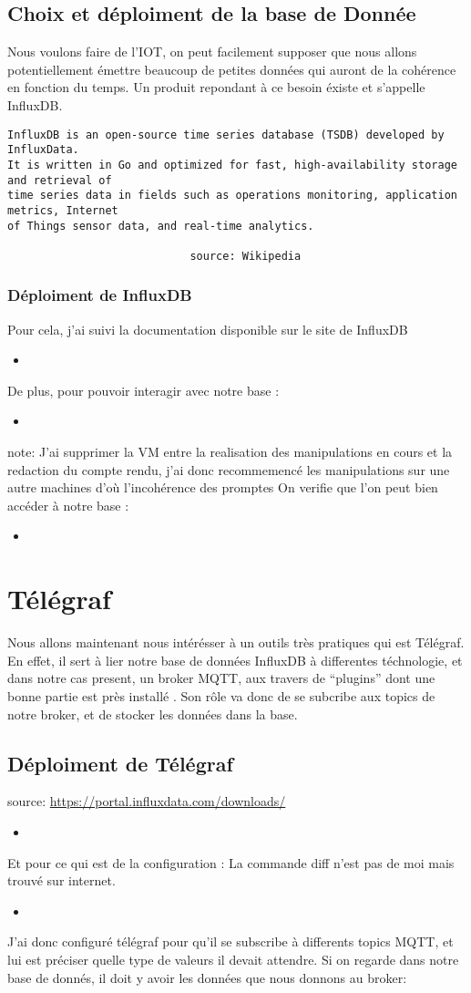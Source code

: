 \documentclass[10pt,a4paper]{article}
\newcommand{\insertcode}[2]{\begin{itemize}\item[]\end{itemize}}
\begin{document}
 \subsection{Choix et déploiment de la base de Donnée}
 Nous voulons faire de l'IOT, on peut facilement supposer que nous allons potentiellement émettre beaucoup de petites données qui auront de la cohérence en fonction du temps. Un produit repondant à ce besoin éxiste et s'appelle InfluxDB. 
\begin{lstlisting}
InfluxDB is an open-source time series database (TSDB) developed by InfluxData.
It is written in Go and optimized for fast, high-availability storage and retrieval of
time series data in fields such as operations monitoring, application metrics, Internet
of Things sensor data, and real-time analytics. 

                            source: Wikipedia 
\end{lstlisting}
\subsubsection{Déploiment de InfluxDB}
Pour cela, j'ai suivi la documentation disponible sur le site de InfluxDB
\insertcode{commande/installinflux.txt}{Installation de InfluxDB}
De plus, pour pouvoir interagir avec notre base :
\insertcode{commande/installclient.txt}{Installation du client}
note: J'ai supprimer la VM entre la realisation des manipulations en cours et la redaction du compte rendu, j'ai donc recommemencé les manipulations sur une autre machines d'où l'incohérence des promptes
On verifie que l'on peut bien accéder à notre base :
\insertcode{commande/influx.txt}{accées à la base}

\section{Télégraf}
Nous allons maintenant nous intérésser à un outils très pratiques qui est Télégraf. En effet, il sert à lier notre base de données InfluxDB à differentes téchnologie, et dans notre cas present, un broker MQTT, aux travers de ``plugins'' dont une bonne partie est près installé . Son rôle va donc de se subcribe aux topics de notre broker, et de stocker les données dans la base. 
\subsection{Déploiment de Télégraf}
source: \url{https://portal.influxdata.com/downloads/}
\insertcode{commande/telegraf.txt}{Déploiment de télégraf}
Et pour ce qui est de la configuration : La commande diff n'est pas de moi mais trouvé sur internet. 
\insertcode{commande/telegrafconf.txt}{Configuration de télégraf}
J'ai donc configuré télégraf pour qu'il se subscribe à differents topics MQTT, et lui est préciser quelle type de valeurs il devait attendre.
Si on regarde dans notre base de donnés, il doit y avoir les données que nous donnons au broker:
\end{document}

